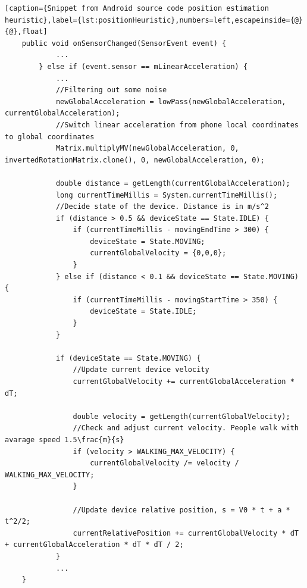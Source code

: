\begin{lstlisting}[caption={Snippet from Android source code position estimation heuristic},label={lst:positionHeuristic},numbers=left,escapeinside={@}{@},float]
    public void onSensorChanged(SensorEvent event) {
            ...
        } else if (event.sensor == mLinearAcceleration) { 
            ...   
            //Filtering out some noise
            newGlobalAcceleration = lowPass(newGlobalAcceleration, currentGlobalAcceleration);
            //Switch linear acceleration from phone local coordinates to global coordinates
            Matrix.multiplyMV(newGlobalAcceleration, 0, invertedRotationMatrix.clone(), 0, newGlobalAcceleration, 0);

            double distance = getLength(currentGlobalAcceleration);
            long currentTimeMillis = System.currentTimeMillis();
            //Decide state of the device. Distance is in m/s^2
            if (distance > 0.5 && deviceState == State.IDLE) {
                if (currentTimeMillis - movingEndTime > 300) {
                    deviceState = State.MOVING;
                    currentGlobalVelocity = {0,0,0};
                }
            } else if (distance < 0.1 && deviceState == State.MOVING) {
                if (currentTimeMillis - movingStartTime > 350) {
                    deviceState = State.IDLE;
                }
            }

            if (deviceState == State.MOVING) {
                //Update current device velocity
                currentGlobalVelocity += currentGlobalAcceleration * dT;
                
                double velocity = getLength(currentGlobalVelocity);
                //Check and adjust current velocity. People walk with avarage speed 1.5\frac{m}{s}
                if (velocity > WALKING_MAX_VELOCITY) {
                    currentGlobalVelocity /= velocity / WALKING_MAX_VELOCITY;
                }
                
                //Update device relative position, s = V0 * t + a * t^2/2;
                currentRelativePosition += currentGlobalVelocity * dT + currentGlobalAcceleration * dT * dT / 2;                 
            }
            ...
    }   
\end{lstlisting}

